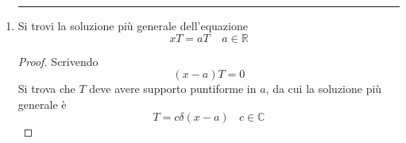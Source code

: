 \documentclass[twoside]{article}
\begin{document}
\begin{enumerate}
    \begin{proof}
    Si verifica che 
    \begin{equation}
        T_p = \mathcal{P}\frac{1}{x}
    \end{equation}
    è una soluzione particolare. Infatti:
    \begin{equation}
        \begin{split}
            <x\mathcal{P}\frac{1}{x},\phi>=<\mathcal{P}\frac{1}{x},x\phi>= \lim_{R\to \infty}\lim_{\varepsilon\to 0^+}\left\{ \int_{-R}^{-\varepsilon}+\int_{\varepsilon}^{R} \right\} \frac{1}{x}x\phi(x) \ dx = \\
            =\lim_{R\to \infty}\lim_{\varepsilon\to 0^+} \left\{ \int_{-R}^{-\varepsilon}+\int_{\varepsilon}^{R} \right\} \phi(x) \ dx= \int_{-\infty}^{\infty}\phi(x) \ dx = \\
            = \int_{-\infty}^{\infty}1 \phi(x) \ dx = <T_1,\phi> \ \ \ \ \ \ \forall \phi \in S
        \end{split}
    \end{equation}
    Ovvero con notazione \textit{lasca}:
    \begin{equation}
        x\mathcal{P}\frac{1}{x}=1
    \end{equation}
    Per trovare la soluzione più generale si somma ora la soluzione dell'omogenea associata
    \begin{equation}
        xT_0=0 \ \ \Rightarrow \ \ T_0=c\delta(x)
    \end{equation}
    Perciò la soluzione più generale della (\ref{noice}) è:
    \begin{equation}
        T=T_p + T_0=\mathcal{P}\frac{1}{x}+c\delta(x)
    \end{equation}
    
    \end{proof}
    
    \item
    \rule{\textwidth}{0.7pt}
    Si trovi la soluzione più generale dell'equazione
    \begin{equation}
        xT=aT \ \ \ \ \ a \in \mathds{R}
    \end{equation}
    
    \begin{proof}
    Scrivendo
    \begin{equation}
        (x-a)T=0
    \end{equation}
    Si trova che $T$ deve avere supporto puntiforme in $a$, da cui la soluzione più generale è 
    \begin{equation}
        T=c\delta(x-a) \ \ \ \ c \in \mathds{C}
    \end{equation}
    
    \end{proof}
    
\end{enumerate}
\end{document}
